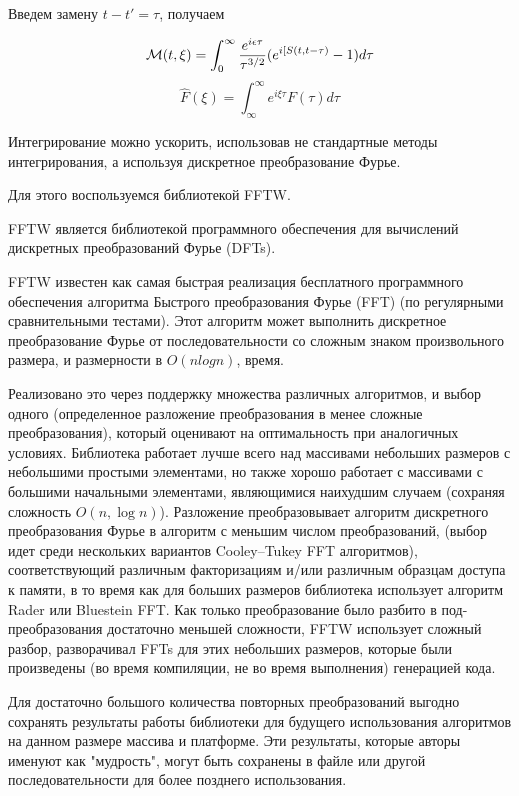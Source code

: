 \documentclass[%
bachelor,    %
natbib,      %
subf,        %
href,        %
colorlinks,  %
]{disser}
\newcommand{\cM}{\mathcal{M}}
\begin{document}
Введем замену $t - t' = \tau$, получаем

\begin{equation}\label{eq:fourier}
	\cM (t, \xi) = \int_{0}^{\infty}\frac{e^{i\epsilon \tau}}{{\tau}^{3/2}}(e^{i [S(t, t-\tau)} - 1) d\tau\\ 
\end{equation}
$$\hat{F}(\xi) = \int_{\infty}^{\infty}e^{i\xi \tau} F(\tau) d\tau $$

Интегрирование можно ускорить, использовав не стандартные методы интегрирования, а используя дискретное преобразование Фурье.

Для этого воспользуемся библиотекой FFTW.

FFTW является библиотекой программного обеспечения для вычислений дискретных преобразований Фурье (DFTs).\cite{fftw:website}

FFTW известен как самая быстрая реализация бесплатного программного обеспечения алгоритма Быстрого преобразования Фурье (FFT) (по регулярными сравнительными тестами). Этот алгоритм может выполнить дискретное преобразование Фурье от последовательности со сложным знаком произвольного размера, и размерности в $O (n log n)$, время.

Реализовано это через поддержку множества различных алгоритмов, и выбор одного (определенное разложение преобразования в менее сложные преобразования), который оценивают на оптимальность при аналогичных условиях. Библиотека работает лучше всего над массивами небольших размеров с небольшими простыми элементами, но также хорошо работает с массивами с большими начальными элементами, являющимися наихудшим случаем (сохраняя сложность $O (n, \log n)$). Разложение преобразовывает алгоритм дискретного преобразования Фурье в алгоритм с  меньшим числом преобразований, (выбор идет среди нескольких вариантов Cooley–Tukey FFT алгоритмов), соответствующий различным факторизациям и/или различным образцам доступа к памяти, в то время как для больших размеров библиотека использует алгоритм Rader или Bluestein FFT. Как только преобразование было разбито в под-преобразования достаточно меньшей сложности, FFTW использует сложный разбор, разворачивал FFTs для этих небольших размеров, которые были произведены (во время компиляции, не во время выполнения) генерацией кода.

Для достаточно большого количества повторных преобразований выгодно сохранять результаты работы библиотеки для будущего использования алгоритмов на данном размере массива и платформе. Эти результаты, которые авторы именуют как "мудрость", могут быть сохранены в файле или другой последовательности для более позднего использования.
\end{document}
